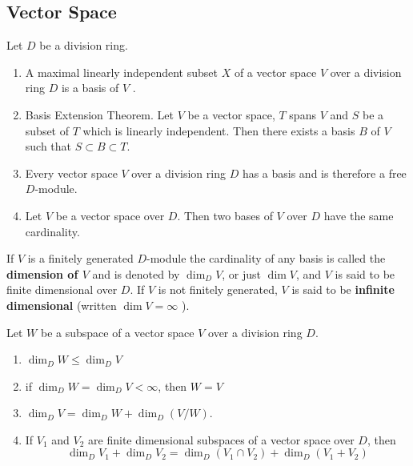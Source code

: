 \subsection{Vector Space} %

\begin{theorem}
    Let $D$ be a division ring.
    \begin{enumerate}
        \item
              A maximal linearly independent subset $X$ of a vector space $V$ over a division ring $D$ is a basis of $V$ .


        \item
              Basis Extension Theorem.
              Let $V$ be a vector space, $T$ spans $V$ and $S$ be a subset of $T$ which is linearly independent. Then there exists a basis $B$ of $V$ such that $S \subset B \subset T$.

        \item
              Every vector space $V$ over a division ring $D$ has a basis and is therefore a free $D$-module.

        \item
              Let $V$ be a vector space over $D$. Then two bases of $V$ over $D$ have the same cardinality.
    \end{enumerate}
\end{theorem}

\begin{definition}
    If $V$ is a finitely generated $D$-module the cardinality of any basis is called the \textbf{dimension of $V$} and is denoted by $\dim_D V$, or just $\dim V$, and $V$ is said to be finite dimensional over $D$.
    If $V$ is not finitely generated, $V$ is said to be \textbf{infinite dimensional} (written $\dim V=\infty$ ).
\end{definition}

\begin{theorem}
    Let $W$ be a subspace of a vector space $V$ over a division ring $D$.
    \begin{enumerate}
        \item
              $\dim_{D} W \leq \dim_{D} V$

        \item
              if $\dim_{D} W=\dim_{D} V < \infty$, then $W=V$

        \item
              $\dim_{D} V=\dim_{D} W+\dim_{D}(V / W)$.

        \item
              If $V_1$ and $V_2$ are finite dimensional subspaces of a vector space over $D$, then
              \begin{equation*}
                  \dim_D V_1 +\dim_{D} V_2
                  =
                  \dim_{D}(V_1 \cap V_2)+\dim_{D}(V_1+V_2)
              \end{equation*}
    \end{enumerate}
\end{theorem}

